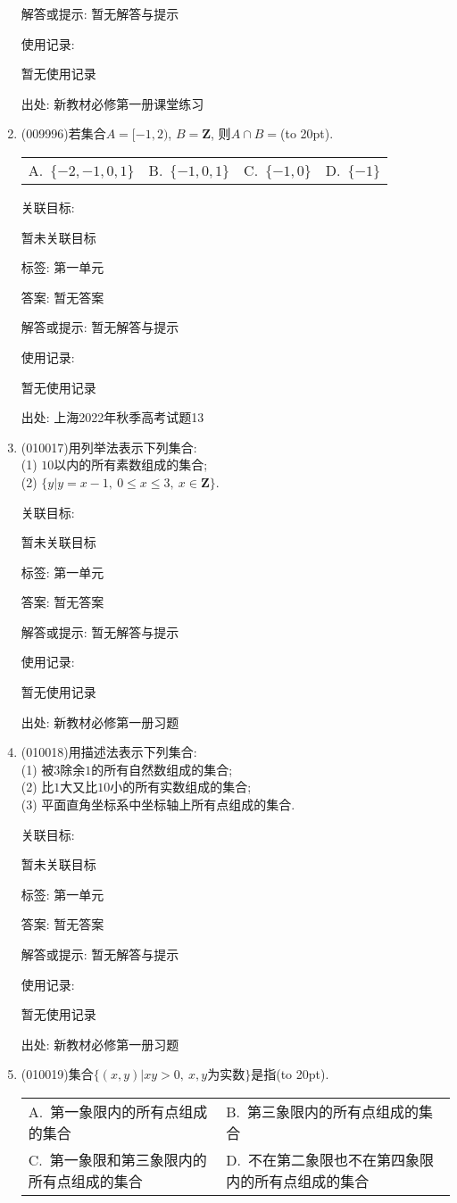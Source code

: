 \documentclass[10pt,a4paper]{article}
\newcommand{\bracket}[1]{(\hbox to #1pt{})}
\newcommand{\twoch}[4]{\par\begin{tabular}{p{.46\textwidth}p{.46\textwidth}}
A.~#1& B.~#2\\
C.~#3& D.~#4
\end{tabular}}
\newcommand{\fourch}[4]{\par\begin{tabular}{p{.23\textwidth}p{.23\textwidth}p{.23\textwidth}p{.23\textwidth}}
A.~#1 &B.~#2& C.~#3& D.~#4
\end{tabular}}
\begin{document}
\begin{enumerate}[1.]
解答或提示: 暂无解答与提示

使用记录:

暂无使用记录


出处: 新教材必修第一册课堂练习
\item { (009996)}若集合$A=[-1,2)$, $B=\mathbf{Z}$, 则$A\cap B=$\bracket{20}.
\fourch{$\{-2,-1,0,1\}$}{$\{-1,0,1\}$}{$\{-1,0\}$}{$\{-1\}$}


关联目标:

暂未关联目标



标签: 第一单元

答案: 暂无答案

解答或提示: 暂无解答与提示

使用记录:

暂无使用记录


出处: 上海2022年秋季高考试题13
\item { (010017)}用列举法表示下列集合:\\
(1) $10$以内的所有素数组成的集合;\\
(2) $\{y|y=x-1,\  0\le x\le 3,\ x\in \mathbf{Z}\}$.


关联目标:

暂未关联目标



标签: 第一单元

答案: 暂无答案

解答或提示: 暂无解答与提示

使用记录:

暂无使用记录


出处: 新教材必修第一册习题
\item { (010018)}用描述法表示下列集合:\\
(1) 被$3$除余$1$的所有自然数组成的集合;\\
(2) 比$1$大又比$10$小的所有实数组成的集合;\\
(3) 平面直角坐标系中坐标轴上所有点组成的集合.


关联目标:

暂未关联目标



标签: 第一单元

答案: 暂无答案

解答或提示: 暂无解答与提示

使用记录:

暂无使用记录


出处: 新教材必修第一册习题
\item { (010019)}集合$\{(x, y)|xy>0, \ x,y\text{为实数}\}$是指\bracket{20}.
\twoch{第一象限内的所有点组成的集合}{第三象限内的所有点组成的集合}{第一象限和第三象限内的所有点组成的集合}{不在第二象限也不在第四象限内的所有点组成的集合}



\end{enumerate}
\end{document}
